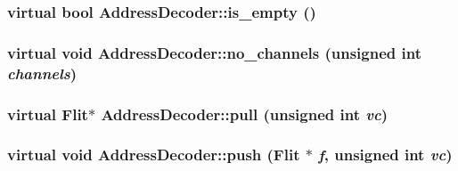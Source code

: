 \hypertarget{classAddressDecoder_0054878bbba62055a8e42934152098fc}{
\subsubsection[{is\_\-empty}]{\setlength{\rightskip}{0pt plus 5cm}virtual bool AddressDecoder::is\_\-empty ()}}
\label{classAddressDecoder_0054878bbba62055a8e42934152098fc}


\hypertarget{classAddressDecoder_9c9fd754c94031dc6c3d185bbd54dd61}{
\subsubsection[{no\_\-channels}]{\setlength{\rightskip}{0pt plus 5cm}virtual void AddressDecoder::no\_\-channels (unsigned int {\em channels})}}
\label{classAddressDecoder_9c9fd754c94031dc6c3d185bbd54dd61}


\hypertarget{classAddressDecoder_f2306deca445f763b23298004ec3d148}{
\subsubsection[{pull}]{\setlength{\rightskip}{0pt plus 5cm}virtual {\bf Flit}$\ast$ AddressDecoder::pull (unsigned int {\em vc})}}
\label{classAddressDecoder_f2306deca445f763b23298004ec3d148}


\hypertarget{classAddressDecoder_563cbf350d2fc3a146b2c772d602fabe}{
\subsubsection[{push}]{\setlength{\rightskip}{0pt plus 5cm}virtual void AddressDecoder::push ({\bf Flit} $\ast$ {\em f}, \/  unsigned int {\em vc})}}
\label{classAddressDecoder_563cbf350d2fc3a146b2c772d602fabe}


